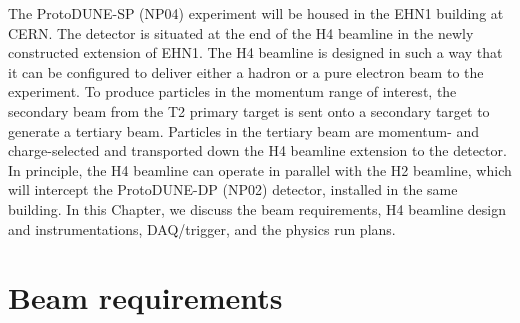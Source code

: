 The ProtoDUNE-SP (NP04) experiment will be housed in the EHN1 building at CERN. The detector is situated at the end of the H4 beamline in the newly constructed extension of EHN1. The H4 beamline is designed in such a way that it can be configured to deliver either a hadron or a pure electron beam to the experiment. To produce particles in the momentum range of interest, the secondary beam from the T2 primary target is sent onto a secondary target to generate a tertiary beam. Particles in the tertiary beam are momentum- and charge-selected and transported down the H4 beamline extension to the detector. 
In principle, the H4 beamline can operate in parallel with the H2 beamline, which will intercept the ProtoDUNE-DP (NP02) detector, installed in the same building. In this Chapter, we discuss the beam requirements, H4 beamline design and instrumentations, DAQ/trigger, and the physics run plans.  

\section{Beam requirements}
\label{sec:beamrequirements}


